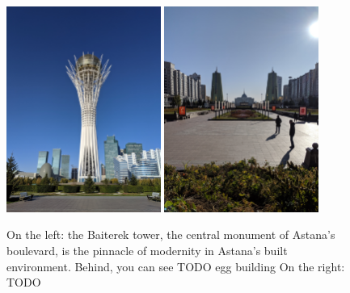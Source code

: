 \documentclass{article}
\begin{document}
\begin{figure}[h!]
	\centering
	\captionsetup{labelformat=empty}
	\includegraphics[width=0.45\textwidth]{astana_modernity}
	\includegraphics[width=0.45\textwidth]{astana_modernity15}
	\caption{On the left: the Baiterek tower, the central monument of Astana's boulevard, is the pinnacle of modernity in Astana's built environment. Behind, you can see TODO egg building
	On the right: TODO}
\end{figure}
\end{document}
